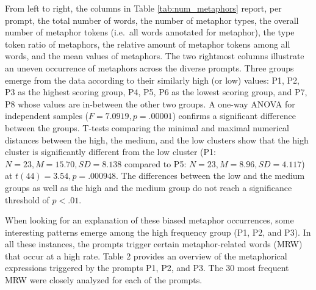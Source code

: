 \documentclass[11pt,a4paper]{article}
\begin{document}
From left to right, the columns in Table \ref{tab:num_metaphors} report, per prompt, the total number of words, the number of metaphor types, the overall number of metaphor tokens (i.e.~all words annotated for metaphor), the type token ratio of metaphors, the relative amount of metaphor tokens among all words, and the mean values of metaphors. The two rightmost columns illustrate an uneven occurrence of metaphors across the diverse prompts. Three groups emerge from the data according to their similarly high (or low) values: P1, P2, P3 as the highest scoring group, P4, P5, P6 as the lowest scoring group, and P7, P8 whose values are in-between the other two groups. A one-way ANOVA for independent samples ($F=7.0919, p=.00001$) confirms a significant difference between the groups. T-tests comparing the minimal and maximal numerical distances between the high, the medium, and the low clusters show that the high cluster is significantly different from the low cluster (P1: $N=23, M=15.70, SD=8.138$ compared to P5: $N=23, M=8.96, SD=4.117$) at $t(44)=3.54, p=.000948$. The differences between the low and the medium groups as well as the high and the medium group do not reach a significance threshold of $p<.01$.  

When looking for an explanation of these biased metaphor occurrences, some interesting patterns emerge among the high frequency group (P1, P2, and P3). In all these instances, the prompts trigger certain metaphor-related words (MRW) that occur at a high rate. Table 2 provides an overview of the metaphorical expressions triggered by the prompts P1, P2, and P3. The 30 most frequent MRW were closely analyzed for each of the prompts. 
\end{document}
